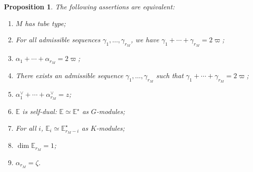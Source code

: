 \documentclass[10pt]{amsart}
\let\oldvee\vee
\renewcommand{\vee}{{\scriptscriptstyle\oldvee}}
\theoremstyle{plain}
\newtheorem{prop}[theo]{Proposition}
\theoremstyle{definition}
\newcommand{\bE}{\mathbb{E}}
\newcommand{\rkm}{{r_M}}
\begin{document}
\begin{prop}
\label{prop:self-dual}
The following assertions are equivalent:
\begin{enumerate}
\item \label{item:tube} $M$ has tube type;
\item \label{item:varpi-forall}
For all admissible sequences $\gamma_1,\ldots,\gamma_\rkm$, we have $\gamma_1+\cdots+\gamma_\rkm = 2 \varpi$;
\item \label{item:varpi-a}
$\alpha_1+\cdots+\alpha_\rkm = 2 \varpi$;
\item \label{item:varpi-exists}
There exists an admissible sequence $\gamma_1,\ldots,\gamma_\rkm$ such that $\gamma_1+\cdots+\gamma_\rkm = 2 \varpi$;
\item \label{item:z}
$\alpha_1^\vee + \cdots + \alpha_\rkm^\vee = z$;
\item \label{item:self-dual}
$\bE$ is self-dual: $\bE \simeq \bE^\star$ as $G$-modules;
\item \label{item:Ei}
For all $i$, $\bE_i \simeq \bE_{\rkm-i}^\star$ as $K$-modules;
\item \label{item:Er}
$\dim \bE_\rkm=1$;
\item \label{item:alpha_r}
$\alpha_\rkm=\zeta$.
\end{enumerate}
\end{prop}
\end{document}
